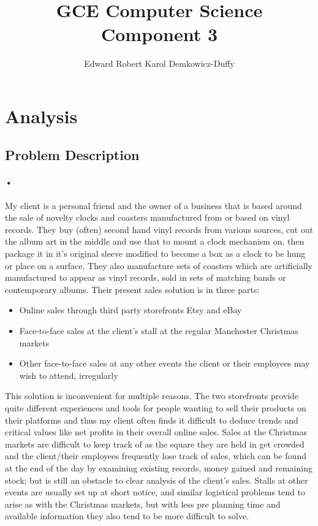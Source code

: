 ﻿\documentclass{article}
\title{GCE Computer Science Component 3}
\author{Edward Robert Karol Demkowicz-Duffy}
\begin{document}
    \maketitle
    
    \tableofcontents
    
    \section{Analysis}
    \subsection{Problem Description}
    \paragraph{•}
    My client is a personal friend and the owner of a business that is based around the sale of novelty clocks and coasters manufactured from or based on vinyl records. 
    They buy (often) second hand vinyl records from various sources, cut out the album art in the middle and use that to mount a clock mechanism on, then package it in it’s original sleeve modified to become a box as a clock to be hung or place on a surface. 
    They also manufacture sets of coasters which are artificially manufactured to appear as vinyl records, sold in sets of matching bands or contemporary albums. 
    Their present sales solution is in three parts:
    \begin{itemize}
    \item Online sales through third party storefronts Etsy and eBay
    \item Face-to-face sales at the client’s stall at the regular Manchester Christmas markets
    \item Other face-to-face sales at any other events the client or their employees may wish to attend, irregularly
    \end{itemize}
    This solution is inconvenient for multiple reasons. 
    The two storefronts provide quite different experiences and tools for people wanting to sell their products on their platforms and thus my client often finds it difficult to deduce trends and critical values like net profits in their overall online sales. 
    Sales at the Christmas markets are difficult to keep track of as the square they are held in get crowded and the client/their employees frequently lose track of sales, which can be found at the end of the day by examining existing records, money gained and remaining stock; but is still an obstacle to clear analysis of the client’s sales. 
    Stalls at other events are usually set up at short notice, and similar logistical problems tend to arise as with the Christmas markets, but with less pre planning time and available information they also tend to be more difficult to solve. 
\end{document}
